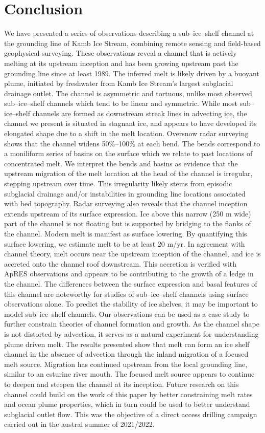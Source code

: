 \section{Conclusion} \label{sec:conclusion}
We have presented a series of observations describing a sub--ice--shelf channel at the grounding line of Kamb Ice Stream, combining remote sensing and field-based geophysical surveying. 
These observations reveal a channel that is actively melting at its upstream inception and has been growing upstream past the grounding line since at least 1989.
The inferred melt is likely driven by a buoyant plume, initiated by freshwater from Kamb Ice Stream's largest subglacial drainage outlet.
The channel is asymmetric and tortuous, unlike most observed sub--ice--shelf channels which tend to be linear and symmetric. While most sub--ice--shelf channels are formed as downstream streak lines in advecting ice, the channel we present is situated in stagnant ice, and appears to have developed its elongated shape due to a shift in the melt location. Oversnow radar surveying shows that the channel widens 50\%--100\% at each bend. The bends correspond to a moniliform series of basins on the surface which we relate to past locations of concentrated melt. 
We interpret the bends and basins as evidence that the upstream migration of the melt location at the head of the channel is irregular, stepping upstream over time. 
This irregularity likely stems from episodic subglacial drainage and/or instabilities in grounding line locations associated with bed topography. Radar surveying also reveals that the channel inception extends upstream of its surface expression. 
Ice above this narrow (250 m wide) part of the channel is not floating but is supported by bridging to the flanks of the channel. 
Modern melt is manifest as surface lowering. By quantifying this surface lowering, we estimate melt to be at least 20 m/yr. In agreement with channel theory, melt occurs near the upstream inception of the channel, and ice is accreted onto the channel roof downstream. This accretion is verified with ApRES observations and appears to be contributing to the growth of a ledge in the channel. The differences between the surface expression and basal features of this channel are noteworthy for studies of sub--ice--shelf channels using surface observations alone. To predict the stability of ice shelves, it may be important to model sub--ice--shelf channels. Our observations can be used as a case study to further constrain theories of channel formation and growth. As the channel shape is not distorted by advection, it serves as a natural experiment for understanding plume driven melt.
The results presented show that melt can form an ice shelf channel in the absence of advection through the inland migration of a focused melt source. Migration has continued upstream from the local grounding line, similar to an esturine river mouth. The focused melt source appears to continue to deepen and steepen the channel at its inception.
Future research on this channel could build on the work of this paper by better constraining melt rates and ocean plume properties, which in turn could be used to better understand subglacial outlet flow. This was the objective of a direct access drilling campaign carried out in the austral summer of 2021/2022.


